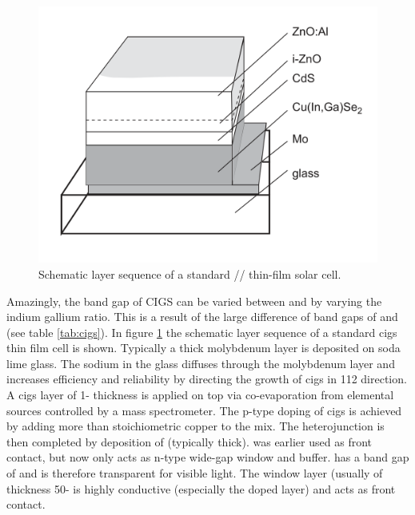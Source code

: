 \begin{figure}[tbh]
	\includegraphics[width=\textwidth]{./Pics/cigs.png}
    \caption{Schematic layer sequence of a standard // thin-film solar cell.\cite{rau2013cigs}}
	\label{fig:cigs}
\end{figure}


Amazingly, the band gap of CIGS can be varied between  and  by varying the indium gallium ratio.
This is a result of the large difference of band gaps of  and  (see table \ref{tab:cigs}). 
In figure \ref{fig:cigs} the schematic layer sequence of a standard \gls{cigs} thin film cell is shown. 
Typically a  thick molybdenum layer is deposited on soda lime glass. 
The sodium in the glass diffuses through the molybdenum layer and increases efficiency and reliability by directing the growth of \gls{cigs} in 112 direction\cite{hedstrom1993cigs}.
A \gls{cigs} layer of 1- thickness is applied on top via co-evaporation from elemental sources controlled by a mass spectrometer.\cite{hedstrom1993cigs}
The p-type doping of \gls{cigs} is achieved by adding more than stoichiometric copper to the mix. 
The heterojunction is then completed by deposition of  (typically  thick).
 was earlier used as front contact, but now only acts as n-type wide-gap window and buffer. 
 has a band gap of  and is therefore transparent for visible light. 
The  window layer (usually of thickness 50- is highly conductive (especially the  doped layer) and acts as front contact. 

